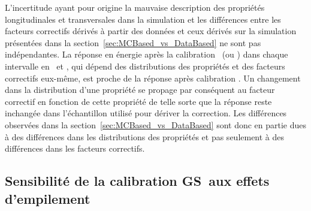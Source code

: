 

L'incertitude ayant pour origine la mauvaise description des propriétés longitudinales et transversales dans la simulation et les différences entre les facteurs correctifs dérivés à partir des données et ceux dérivés sur la simulation présentées dans la section~\ref{sec:MCBased_vs_DataBased} ne sont pas indépendantes. La réponse en énergie après la calibration \GS~(ou \GSL) dans chaque intervalle en \ptjet~et \eta, qui dépend des distributions des propriétés et des facteurs correctifs eux-m\^eme, est proche de la réponse après calibration \EMJES. Un changement dans la distribution d'une propriété se propage par conséquent au facteur correctif en fonction de cette propriété de telle sorte que la réponse reste inchangée dans l'échantillon utilisé pour dériver la correction. Les différences observées dans la section~\ref{sec:MCBased_vs_DataBased} sont donc en partie dues à des différences dans les distributions des propriétés et pas seulement à des diff\'erences dans les facteurs correctifs.

\subsection{Sensibilité de la calibration GS~aux effets d'empilement}

